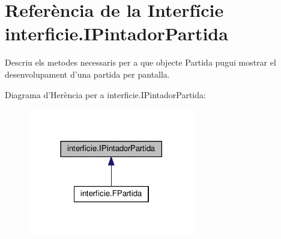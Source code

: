 \hypertarget{interfaceinterficie_1_1_i_pintador_partida}{\section{Referència de la Interfície interficie.\+I\+Pintador\+Partida}
\label{interfaceinterficie_1_1_i_pintador_partida}
}


Descriu els metodes necessaris per a que objecte Partida pugui mostrar el desenvolupament d'una partida per pantalla.  




Diagrama d'Herència per a interficie.\+I\+Pintador\+Partida\+:
\nopagebreak
\begin{figure}[H]
\begin{center}
\leavevmode
\includegraphics[width=206pt]{interfaceinterficie_1_1_i_pintador_partida__inherit__graph}
\end{center}
\end{figure}
